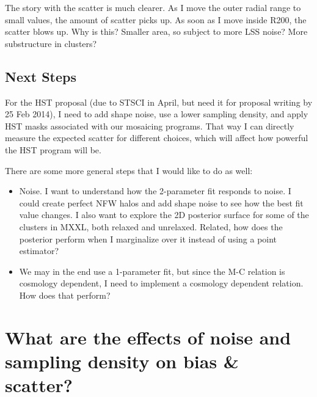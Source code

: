 \documentclass[11pt]{article}
\begin{document}
The story with the scatter is much clearer. As I move the outer radial range to small values, the amount of scatter picks up. As soon as I move inside R200, the scatter blows up. Why is this? Smaller area, so subject to more LSS noise? More substructure in clusters?

\subsection{Next Steps}

For the HST proposal (due to STSCI in April, but need it for proposal writing by 25 Feb 2014), I need to add shape noise, use a lower sampling density, and apply HST masks associated with our mosaicing programs. That way I can directly measure the expected scatter for different choices, which will affect how powerful the HST program will be. 

There are some more general steps that I would like to do as well:
\begin{itemize}
\item Noise. I want to understand how the 2-parameter fit responds to noise. I could create perfect NFW halos and add shape noise to see how the best fit value changes. I also want to explore the 2D posterior surface for some of the clusters in MXXL, both relaxed and unrelaxed. Related, how does the posterior perform when I marginalize over it instead of using a point estimator?
\item We may in the end use a 1-parameter fit, but since the M-C relation is cosmology dependent, I need to implement a cosmology dependent relation. How does that perform?
\end{itemize}



\clearpage \newpage

\section{What are the effects of noise and sampling density on bias \& scatter?}
\label{sec:noisebias}
\end{document}
